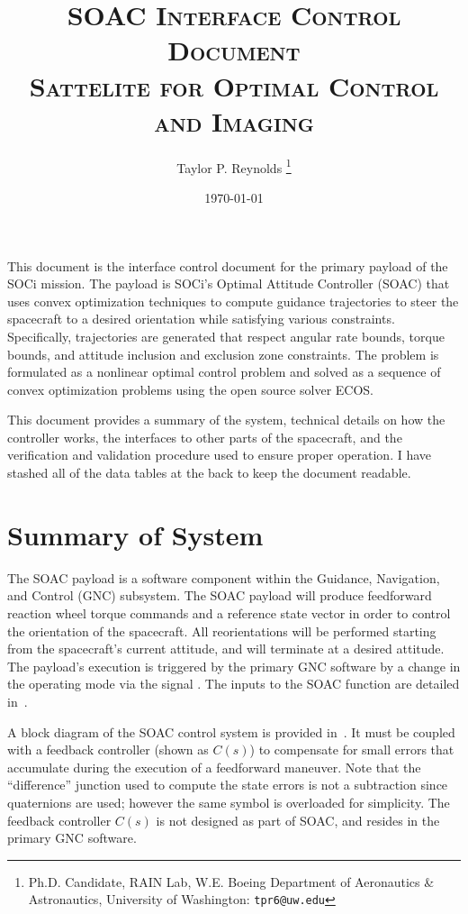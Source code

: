 \documentclass[10pt]{article}
\title{\textsc{SOAC Interface Control Document \\ {\small \textbf{S}attelite for \textbf{O}ptimal \textbf{C}ontrol and \textbf{I}maging}}}
\author{
  Taylor P. Reynolds%
  \thanks{Ph.D. Candidate, RAIN Lab, W.E. Boeing Department of Aeronautics \& Astronautics, University of Washington: \texttt{tpr6@uw.edu} } }
\date{\today}
\begin{document}
 
\maketitle

This document is the interface control document for the primary payload of the SOCi mission. The payload is SOCi's Optimal Attitude Controller (SOAC) that uses convex optimization techniques to compute guidance trajectories to steer the spacecraft to a desired orientation while satisfying various constraints. Specifically, trajectories are generated that respect angular rate bounds, torque bounds, and attitude inclusion and exclusion zone constraints. The problem is formulated as a nonlinear optimal control problem and solved as a sequence of convex optimization problems using the open source solver ECOS.

This document provides a summary of the system, technical details on how the controller works, the interfaces to other parts of the spacecraft, and the verification and validation procedure used to ensure proper operation. I have stashed all of the data tables at the back to keep the document readable.

\section{Summary of System}\label{sec:summary}

The SOAC payload is a software component within the Guidance, Navigation, and Control (GNC) subsystem. The SOAC payload will produce feedforward reaction wheel torque commands and a reference state vector in order to control the orientation of the spacecraft. All reorientations will be performed starting from the spacecraft’s current attitude, and will terminate at a desired attitude. The payload's execution is triggered by the primary GNC software by a change in the operating mode via the signal . The inputs to the SOAC function are detailed in~.

A block diagram of the SOAC control system is provided in~. It must be coupled with a feedback controller (shown as $C(s)$) to compensate for small errors that accumulate during the execution of a feedforward maneuver. Note that the ``difference'' junction used to compute the state errors is not a subtraction since quaternions are used; however the same symbol is overloaded for simplicity. The feedback controller $C(s)$ is not designed as part of SOAC, and resides in the primary GNC software.
\end{document}
